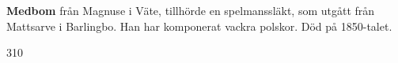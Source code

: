 \textbf{Medbom} från Magnuse i Väte, tillhörde en spelmanssläkt, som utgått från Mattsarve i Barlingbo. Han har komponerat vackra polskor. Död på 1850-talet. 

310 
